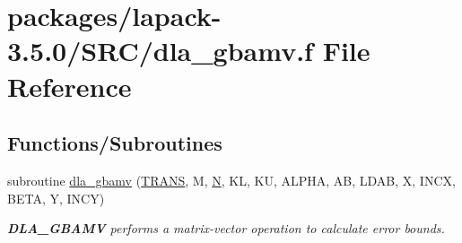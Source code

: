 \hypertarget{dla__gbamv_8f}{}\section{packages/lapack-\/3.5.0/\+S\+R\+C/dla\+\_\+gbamv.f File Reference}
\label{dla__gbamv_8f}
\subsection*{Functions/\+Subroutines}
\begin{DoxyCompactItemize}
\item 
subroutine \hyperlink{group__doubleGBcomputational_ga56d796bfc96e72878e2c62d5aa1ab54b}{dla\+\_\+gbamv} (\hyperlink{superlu__enum__consts_8h_a0c4e17b2d5cea33f9991ccc6a6678d62a1f61e3015bfe0f0c2c3fda4c5a0cdf58}{T\+R\+A\+N\+S}, M, \hyperlink{polmisc_8c_a0240ac851181b84ac374872dc5434ee4}{N}, K\+L, K\+U, A\+L\+P\+H\+A, A\+B, L\+D\+A\+B, X, I\+N\+C\+X, B\+E\+T\+A, Y, I\+N\+C\+Y)
\begin{DoxyCompactList}\small\item\em {\bfseries D\+L\+A\+\_\+\+G\+B\+A\+M\+V} performs a matrix-\/vector operation to calculate error bounds. \end{DoxyCompactList}\end{DoxyCompactItemize}

